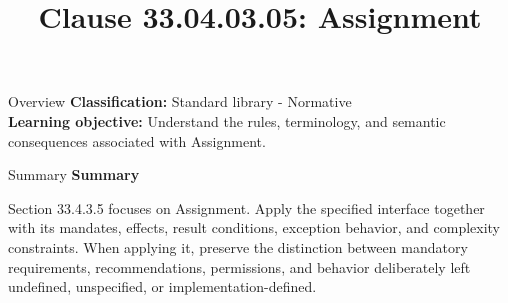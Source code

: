 \documentclass[10pt,letterpaper]{article}
\title{Clause 33.04.03.05: Assignment}
\author{}
\date{}
\begin{document}
\maketitle
\begin{CornellOverviewBox}{Overview}
\textbf{Classification:} Standard library - Normative\\[2pt]
\textbf{Learning objective:} Understand the rules, terminology, and semantic consequences associated with Assignment.
\end{CornellOverviewBox}\begin{CornellSummaryBox}{Summary}
{\sffamily\bfseries\color{Accent} Summary}\par\vspace{3pt}Section 33.4.3.5 focuses on Assignment. Apply the specified interface together with its mandates, effects, result conditions, exception behavior, and complexity constraints. When applying it, preserve the distinction between mandatory requirements, recommendations, permissions, and behavior deliberately left undefined, unspecified, or implementation-defined.
\end{CornellSummaryBox}
\end{document}
